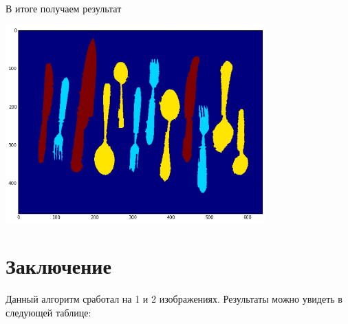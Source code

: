 \documentclass[12pt, a4paper]{article}
\begin{document}
            В итоге получаем результат
            \begin{center}
                \includegraphics[width=10cm]{9.png}
            \end{center}


    \newpage
    \section{Заключение}

        Данный алгоритм сработал на 1 и 2 изображениях. Результаты можно увидеть в следующей таблице:
\end{document}
